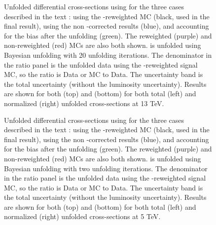 \begin{figure}[h]
\centering
{}

\caption{Unfolded differential cross-sections using \ut for the three cases described in the text : using the \pt-reweighted MC (black, used in the final result), using the non \pt-corrected results (blue), and accounting for the bias after the unfolding (green). The reweighted (purple) and non-reweighted (red) MCs are also both shown. \ut is unfolded using Bayesian unfolding with 20 unfolding iterations. The denominator in the ratio panel is the unfolded data using the \pt-reweighted signal MC, so the ratio is Data or MC to Data. The uncertainty band is the total uncertainty (without the luminosity uncertainty). Results are shown for both \Zee (top) and \Zmm (bottom) for both total (left) and normalized (right) unfolded cross-sections at 13 TeV.}\end{figure}

\begin{figure}[h]
\centering
{}

\caption{Unfolded differential cross-sections using \ptdilep for the three cases described in the text : using the \pt-reweighted MC (black, used in the final result), using the non \pt-corrected results (blue), and accounting for the bias after the unfolding (green). The reweighted (purple) and non-reweighted (red) MCs are also both shown. \ptdilep is unfolded using Bayesian unfolding with two unfolding iterations. The denominator in the ratio panel is the unfolded data using the \pt-reweighted signal MC, so the ratio is Data or MC to Data. The uncertainty band is the total uncertainty (without the luminosity uncertainty). Results are shown for both \Zee (top) and \Zmm (bottom) for both total (left) and normalized (right) unfolded cross-sections at 5 TeV.}\end{figure}

